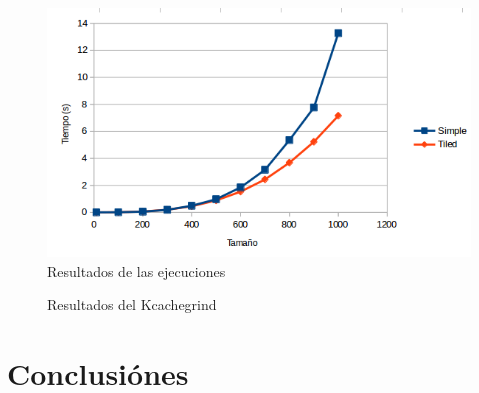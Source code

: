 \documentclass[a4paper,12pt]{article}
\begin{document}
\begin{figure}
 \centering
 \includegraphics[scale=0.6]{Grafico_res.png}
 \caption{Resultados de las ejecuciones}
 \label{res_fig}
\end{figure}

\begin{figure}
  \centering
  \caption{Resultados del Kcachegrind}
\end{figure}

\newpage

\section{Conclusiónes}
\end{document}
